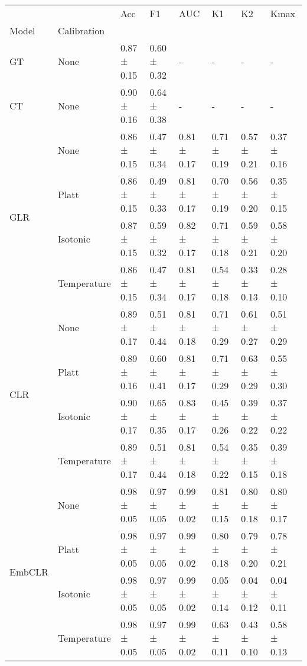 \begin{tabular}{llllllll}
\toprule
 &  & Acc & F1 & AUC & K1 & K2 & Kmax \\
Model & Calibration &  &  &  &  &  &  \\
\midrule
GT & None & 0.87 ± 0.15 & 0.60 ± 0.32 & - & - & - & - \\
\cline{1-8}
CT & None & 0.90 ± 0.16 & 0.64 ± 0.38 & - & - & - & - \\
\cline{1-8}
\multirow[t]{4}{*}{GLR} & None & 0.86 ± 0.15 & 0.47 ± 0.34 & 0.81 ± 0.17 & 0.71 ± 0.19 & 0.57 ± 0.21 & 0.37 ± 0.16 \\
 & Platt & 0.86 ± 0.15 & 0.49 ± 0.33 & 0.81 ± 0.17 & 0.70 ± 0.19 & 0.56 ± 0.20 & 0.35 ± 0.15 \\
 & Isotonic & 0.87 ± 0.15 & 0.59 ± 0.32 & 0.82 ± 0.17 & 0.71 ± 0.18 & 0.59 ± 0.21 & 0.58 ± 0.20 \\
 & Temperature & 0.86 ± 0.15 & 0.47 ± 0.34 & 0.81 ± 0.17 & 0.54 ± 0.18 & 0.33 ± 0.13 & 0.28 ± 0.10 \\
\cline{1-8}
\multirow[t]{4}{*}{CLR} & None & 0.89 ± 0.17 & 0.51 ± 0.44 & 0.81 ± 0.18 & 0.71 ± 0.29 & 0.61 ± 0.27 & 0.51 ± 0.29 \\
 & Platt & 0.89 ± 0.16 & 0.60 ± 0.41 & 0.81 ± 0.17 & 0.71 ± 0.29 & 0.63 ± 0.29 & 0.55 ± 0.30 \\
 & Isotonic & 0.90 ± 0.17 & 0.65 ± 0.35 & 0.83 ± 0.17 & 0.45 ± 0.26 & 0.39 ± 0.22 & 0.37 ± 0.22 \\
 & Temperature & 0.89 ± 0.17 & 0.51 ± 0.44 & 0.81 ± 0.18 & 0.54 ± 0.22 & 0.35 ± 0.15 & 0.39 ± 0.18 \\
\cline{1-8}
\multirow[t]{4}{*}{EmbCLR} & None & 0.98 ± 0.05 & 0.97 ± 0.05 & 0.99 ± 0.02 & 0.81 ± 0.15 & 0.80 ± 0.18 & 0.80 ± 0.17 \\
 & Platt & 0.98 ± 0.05 & 0.97 ± 0.05 & 0.99 ± 0.02 & 0.80 ± 0.18 & 0.79 ± 0.20 & 0.78 ± 0.21 \\
 & Isotonic & 0.98 ± 0.05 & 0.97 ± 0.05 & 0.99 ± 0.02 & 0.05 ± 0.14 & 0.04 ± 0.12 & 0.04 ± 0.11 \\
 & Temperature & 0.98 ± 0.05 & 0.97 ± 0.05 & 0.99 ± 0.02 & 0.63 ± 0.11 & 0.43 ± 0.10 & 0.58 ± 0.13 \\
\cline{1-8}
\bottomrule
\end{tabular}
